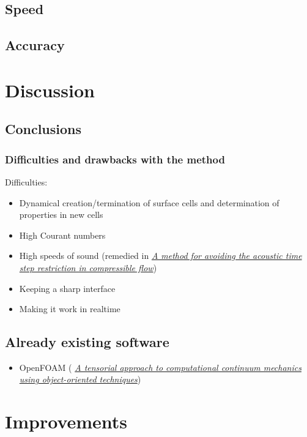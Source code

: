 \section{Speed}

\section{Accuracy}

\chapter{Discussion}

\section{Conclusions}

\subsection{Difficulties and drawbacks with the method}

Difficulties:
\begin{itemize}
    \item Dynamical creation/termination of surface cells and determination of properties in new cells
    \item High Courant numbers
    \item High speeds of sound (remedied in \textit{\href{http://physbam.stanford.edu/~kwatra/papers/compressible_semi_implicit/compressible_semi_implicit.pdf}{A method for avoiding the acoustic time step restriction in compressible flow}})
    \item Keeping a sharp interface
    \item Making it work in realtime
\end{itemize}

\section{Already existing software}

\begin{itemize}
    \item OpenFOAM ( \textit{\href{http://powerlab.fsb.hr/ped/kturbo/openfoam/docs/foam.pdf}{A tensorial approach to computational continuum mechanics using object-oriented techniques}})
\end{itemize}

\chapter{Improvements}

